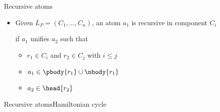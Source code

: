 \begin{frame}{Recursive atoms}
  \bigskip
  \begin{itemize}
  \item Given \(L_P = (C_1, \dots, C_n)\), an atom \(a_1\) is \alert{recursive} in component \(C_i\)

    if \(a_1\) unifies \(a_2\) such that

    \smallskip
    \begin{itemize}\normalsize
    \item \(r_1 \in C_i\) and \(r_2 \in C_j\) with \(i \leq j\)
    \item \(a_1 \in \pbody{r_1}\cup\nbody{r_1}\)
    \item \(a_2 \in \head{r_2}\)
    \end{itemize}
  \end{itemize}
\end{frame}
\begin{frame}[shrink]{Recursive atoms}{Hamiltonian cycle}
  \begin{center}
    \DepGraph[\alert]
  \end{center}
\end{frame}
